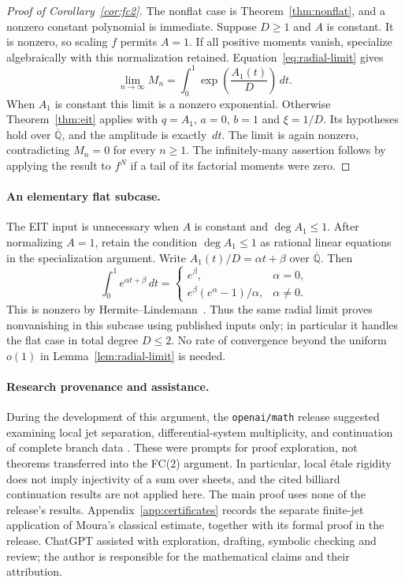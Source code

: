 \documentclass[11pt]{article}
\numberwithin{equation}{section}
\theoremstyle{definition}\newtheorem{definition}[theorem]{Definition}
\theoremstyle{remark}\newtheorem{remark}[theorem]{Remark}
\newcommand{\Qb}{\overline{\mathbb Q}}
\newcommand{\dd}{\,d}
\begin{document}
\begin{proof}[Proof of Corollary~\ref{cor:fc2}]
The nonflat case is Theorem~\ref{thm:nonflat}, and a nonzero constant
polynomial is immediate. Suppose $D\ge1$ and $A$ is constant.
It is nonzero, so scaling $f$ permits $A=1$. If all positive moments
vanish, specialize algebraically with this normalization retained.
Equation~\eqref{eq:radial-limit} gives
\[
 \lim_{n\to\infty}M_n=\int_0^1\exp\!\left(\frac{A_1(t)}D\right)\dd t.
\]
When $A_1$ is constant this limit is a nonzero exponential.
Otherwise Theorem~\ref{thm:eit} applies with $q=A_1$, $a=0$, $b=1$
and $\xi=1/D$. Its hypotheses hold over $\Qb$, and the amplitude is
exactly $\dd t$. The limit is again nonzero, contradicting $M_n=0$
for every $n\ge1$.
The infinitely-many assertion follows by applying the result to $f^N$
if a tail of its factorial moments were zero.
\end{proof}

\paragraph{An elementary flat subcase.}
The EIT input is unnecessary when $A$ is constant and $\deg A_1\le1$.
After normalizing $A=1$, retain the condition $\deg A_1\le1$ as rational
linear equations in the specialization argument. Write
$A_1(t)/D=\alpha t+\beta$ over $\Qb$. Then
\[
 \int_0^1e^{\alpha t+\beta}\dd t
 =\begin{cases}
 e^\beta,&\alpha=0,\\[2pt]
 e^\beta(e^\alpha-1)/\alpha,&\alpha\ne0.
 \end{cases}
\]
This is nonzero by Hermite--Lindemann~\cite{Baker}. Thus the same radial
limit proves nonvanishing in this subcase using published inputs only;
in particular it handles the flat case in total degree $D\le2$.
No rate of convergence beyond the uniform $o(1)$ in
Lemma~\ref{lem:radial-limit} is needed.

\paragraph{Research provenance and assistance.}
During the development of this argument, the \texttt{openai/math}
release suggested examining local jet separation, differential-system
multiplicity, and continuation of complete branch data
\cite{OAIJets,OAIMultiplicity,OAIContinuation}.
These were prompts for proof exploration, not theorems transferred into
the FC(2) argument. In particular, local \'etale rigidity does not imply
injectivity of a sum over sheets, and the cited billiard continuation
results are not applied here. The main proof uses none of the release's
results. Appendix~\ref{app:certificates} records the separate finite-jet
application of Moura's classical estimate, together with its formal
proof in the release. ChatGPT assisted with exploration, drafting,
symbolic checking and review; the author is responsible for the
mathematical claims and their attribution.
\end{document}

